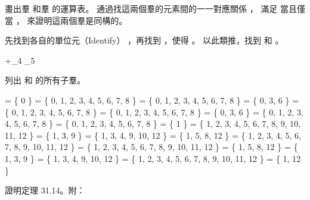 \startsection[
  title={Modular arithmetic},
]

\startEXERCISE
畫出羣 和羣  的運算表。
通過找這兩個羣的元素間的一一對應關係 \alpha，
滿足  當且僅當 ，
來證明這兩個羣是同構的。
\stopEXERCISE

\startANSWER
先找到各自的單位元（Identify） ，再找到 ，使得 。
以此類推，找到  和 。

\startcolumns[n=3, rule=on]
\startformula\startmathalignment[n=3]
\NC +_4 \NC \rightarrow \NC \cdot_5 \NR
{} \NC \rightarrow {} \NR
{} \NC \rightarrow {} \NR
{} \NC \rightarrow {} \NR
{} \NC \rightarrow {} \NR
\stopmathalignment\stopformula
\column

\column

\stopcolumns
\stopANSWER

\startEXERCISE
列出  和  的所有子羣。
\stopEXERCISE

\startANSWER
\startcolumns[n=2, rule=on]
\startformula\startmathalignment
\NC {} \rangle \NC= \{ 0 \} \NR
\NC {} \rangle \NC= \{ 0, 1, 2, 3, 4, 5, 6, 7, 8 \} \NR
\NC {} \rangle \NC= \{ 0, 1, 2, 3, 4, 5, 6, 7, 8 \} \NR
\NC {} \rangle \NC= \{ 0, 3, 6 \} \NR
\NC {} \rangle \NC= \{ 0, 1, 2, 3, 4, 5, 6, 7, 8 \} \NR
\NC {} \rangle \NC= \{ 0, 1, 2, 3, 4, 5, 6, 7, 8 \} \NR
\NC {} \rangle \NC= \{ 0, 3, 6 \} \NR
\NC {} \rangle \NC= \{ 0, 1, 2, 3, 4, 5, 6, 7, 8 \} \NR
\NC {} \rangle \NC= \{ 0, 1, 2, 3, 4, 5, 6, 7, 8 \} \NR
\stopmathalignment\stopformula
\column
\startformula\startmathalignment
\NC {} \rangle \NC= \{ 1 \} \NR
\NC {} \rangle \NC= \{ 1, 2, 3, 4, 5, 6, 7, 8, 9, 10, 11, 12 \} \NR
\NC {} \rangle \NC= \{ 1, 3, 9 \} \NR
\NC {} \rangle \NC= \{ 1, 3, 4, 9, 10, 12 \} \NR
\NC {} \rangle \NC= \{ 1, 5, 8, 12 \} \NR
\NC {} \rangle \NC= \{ 1, 2, 3, 4, 5, 6, 7, 8, 9, 10, 11, 12 \} \NR
\NC {} \rangle \NC= \{ 1, 2, 3, 4, 5, 6, 7, 8, 9, 10, 11, 12 \} \NR
\NC {} \rangle \NC= \{ 1, 5, 8, 12 \} \NR
\NC {} \rangle \NC= \{ 1, 3, 9 \} \NR
\NC {} \rangle \NC= \{ 1, 3, 4, 9, 10, 12 \} \NR
\NC {} \rangle \NC= \{ 1, 2, 3, 4, 5, 6, 7, 8, 9, 10, 11, 12 \} \NR
\NC {} \rangle \NC= \{ 1, 12 \} \NR
\stopmathalignment\stopformula
\stopcolumns
\stopANSWER

\startEXERCISE
證明定理 31.14。附：

